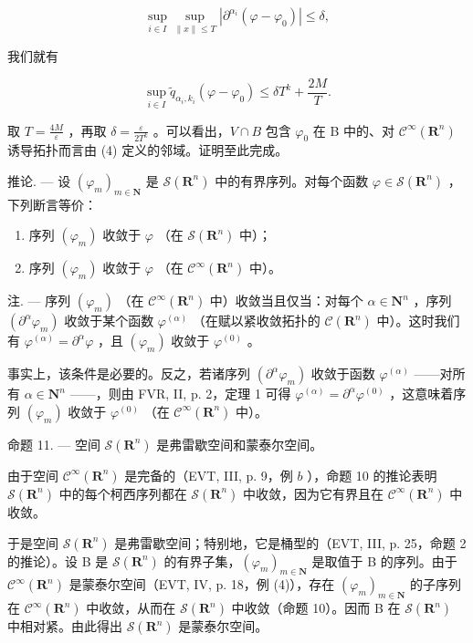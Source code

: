 \[
\sup _ {i \in I} \sup _ {\| x \| \leqslant T} | \partial^ {\alpha_ {i}} (\varphi - \varphi_ {0}) | \leqslant \delta ,\tag{4}
\]

我们就有

\[
\sup _ {i \in I} \widetilde {q} _ {\alpha_ {i}, k _ {i}} (\varphi - \varphi_ {0}) \leqslant \delta T ^ {k} + \frac {2 M}{T}.
\]

取 \(T = \frac{4M}{\varepsilon}\) ，再取 \(\delta = \frac{\varepsilon}{2T^{k}}\) 。可以看出，\(V \cap B\) 包含 \(\varphi_{0}\) 在 B 中的、对 \(\mathcal{C}^{\infty}(\mathbf{R}^{n})\) 诱导拓扑而言由 (4) 定义的邻域。证明至此完成。

推论. --- 设 \((\varphi_{m})_{m\in\mathbf{N}}\) 是 \(\mathcal{S}(\mathbf{R}^{n})\) 中的有界序列。对每个函数 \(\varphi\in\mathcal{S}(\mathbf{R}^{n})\) ，下列断言等价：

\begin{enumerate}
\def\labelenumi{\alph{enumi})}
\item
  序列 \((\varphi_{m})\) 收敛于 \(\varphi\) （在 \(\mathcal{S}(\mathbf{R}^n)\) 中）；
\item
  序列 \((\varphi_{m})\) 收敛于 \(\varphi\) （在 \(\mathcal{C}^{\infty}(\mathbf{R}^{n})\) 中）。
\end{enumerate}

注. --- 序列 \((\varphi_{m})\) （在 \(\mathcal{C}^{\infty}(\mathbf{R}^{n})\) 中）收敛当且仅当：对每个 \(\alpha\in \mathbf{N}^{n}\) ，序列 \((\partial^{\alpha}\varphi_{m})\) 收敛于某个函数 \(\varphi^{(\alpha)}\) （在赋以紧收敛拓扑的 \(\mathcal{C}(\mathbf{R}^{n})\) 中）。这时我们有 \(\varphi^{(\alpha)}=\partial^{\alpha}\varphi\) ，且 \((\varphi_{m})\) 收敛于 \(\varphi^{(0)}\) 。

事实上，该条件是必要的。反之，若诸序列 \((\partial^{\alpha}\varphi_{m})\) 收敛于函数 \(\varphi^{(\alpha)}\) ——对所有 \(\alpha\in \mathbf{N}^{n}\) ——，则由 FVR, II, p. 2，定理 1 可得 \(\varphi^{(\alpha)}=\partial^{\alpha}\varphi^{(0)}\) ，这意味着序列 \((\varphi_{m})\) 收敛于 \(\varphi^{(0)}\) （在 \(\mathcal{C}^{\infty}(\mathbf{R}^{n})\) 中）。

命题 11. --- 空间 \(\mathcal{S}(\mathbf{R}^{n})\) 是弗雷歇空间和蒙泰尔空间。

由于空间 \(\mathcal{C}^{\infty}(\mathbf{R}^{n})\) 是完备的（EVT, III, p. 9，例 \(b\) ），命题 10 的推论表明 \(\mathcal{S}(\mathbf{R}^{n})\) 中的每个柯西序列都在 \(\mathcal{S}(\mathbf{R}^{n})\) 中收敛，因为它有界且在 \(\mathcal{C}^{\infty}(\mathbf{R}^{n})\) 中收敛。

于是空间 \(\mathcal{S}(\mathbf{R}^n)\) 是弗雷歇空间；特别地，它是桶型的（EVT, III, p. 25，命题 2 的推论）。设 B 是 \(\mathcal{S}(\mathbf{R}^n)\) 的有界子集，\((\varphi_m)_{m \in \mathbf{N}}\) 是取值于 B 的序列。由于 \(\mathcal{C}^\infty(\mathbf{R}^n)\) 是蒙泰尔空间（EVT, IV, p. 18，例 (4)），存在 \((\varphi_m)_{m \in \mathbf{N}}\) 的子序列在 \(\mathcal{C}^\infty(\mathbf{R}^n)\) 中收敛，从而在 \(\mathcal{S}(\mathbf{R}^n)\) 中收敛（命题 10）。因而 B 在 \(\mathcal{S}(\mathbf{R}^n)\) 中相对紧。由此得出 \(\mathcal{S}(\mathbf{R}^n)\) 是蒙泰尔空间。

